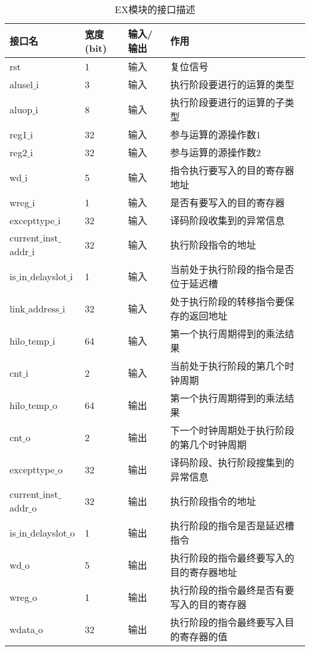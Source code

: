 \quad
\begin{table}[H]
	\centering
	\caption{EX模块的接口描述}
	\begin{tabular}{|l|l|l|l|}
		\hline
		接口名 & 宽度(bit) & 输入/输出 & 作用 \\
		\hline
		rst & 1 & 输入 & 复位信号 \\
		\hline
		alusel$\_$i & 3 & 输入 & 执行阶段要进行的运算的类型 \\
		\hline
		aluop$\_$i & 8 & 输入 & 执行阶段要进行的运算的子类型 \\
		\hline
		reg1$\_$i & 32 & 输入 & 参与运算的源操作数1 \\
		\hline
		reg2$\_$i & 32 & 输入 & 参与运算的源操作数2 \\
		\hline
		wd$\_$i & 5 & 输入 & 指令执行要写入的目的寄存器地址 \\
		\hline
		wreg$\_$i & 1 & 输入 & 是否有要写入的目的寄存器 \\
		\hline
		excepttype$\_$i & 32 & 输入 & 译码阶段收集到的异常信息 \\
		\hline
		current$\_$inst$\_$addr$\_$i & 32 & 输入 & 执行阶段指令的地址 \\
		\hline
		is$\_$in$\_$delayslot$\_$i & 1 & 输入 & 当前处于执行阶段的指令是否位于延迟槽 \\
		\hline
		link$\_$address$\_$i & 32 & 输入 & 处于执行阶段的转移指令要保存的返回地址 \\
		\hline
		hilo$\_$temp$\_$i & 64 & 输入 & 第一个执行周期得到的乘法结果 \\
		\hline
		cnt$\_$i & 2 & 输入 & 当前处于执行阶段的第几个时钟周期 \\
		\hline
		hilo$\_$temp$\_$o & 64 & 输出 & 第一个执行周期得到的乘法结果 \\
		\hline
		cnt$\_$o & 2 & 输出 & 下一个时钟周期处于执行阶段的第几个时钟周期 \\
		\hline
		excepttype$\_$o & 32 & 输出 & 译码阶段、执行阶段搜集到的异常信息 \\
		\hline
		current$\_$inst$\_$addr$\_$o & 32 & 输出 & 执行阶段指令的地址 \\
		\hline
		is$\_$in$\_$delayslot$\_$o & 1 & 输出 & 执行阶段的指令是否是延迟槽指令 \\
		\hline
		wd$\_$o & 5 & 输出 & 执行阶段的指令最终要写入的目的寄存器地址 \\
		\hline
		wreg$\_$o & 1 & 输出 & 执行阶段的指令最终是否有要写入的目的寄存器 \\
		\hline
		wdata$\_$o & 32 & 输出 & 执行阶段的指令最终要写入目的寄存器的值 \\

\end{tabular}
\end{table}
